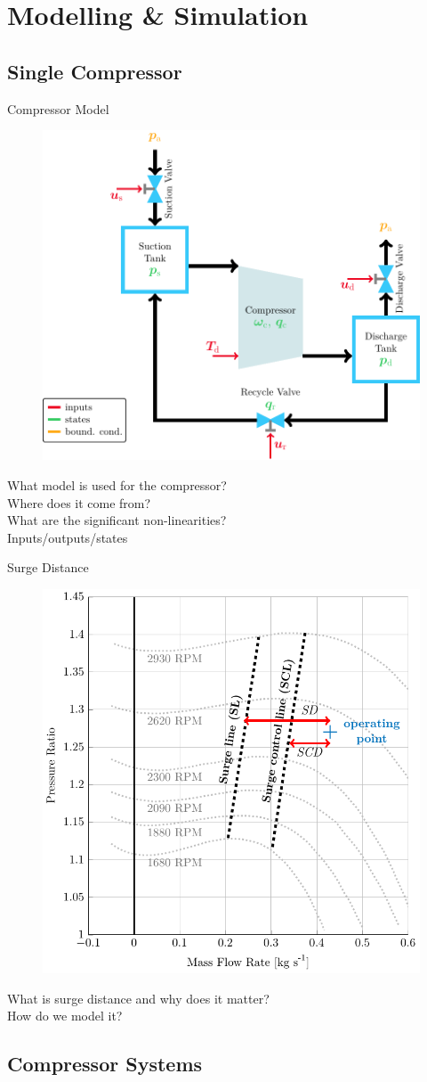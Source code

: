 \section{Modelling \& Simulation}

\subsection{Single Compressor}
\begin{frame}{Compressor Model}
  \begin{figure}[H]
    \centering
    \includegraphics[width=.5\linewidth]{figures/compressor.pdf}
  \end{figure}
  What model is used for the compressor?\\
  Where does it come from?\\
  What are the significant non-linearities?\\
  Inputs/outputs/states
\end{frame}

\begin{frame}{Surge Distance}
  \begin{figure}[H]
    \centering
    \includegraphics[width=.3\linewidth]{figures/surge.pdf}
  \end{figure}
  What is surge distance and why does it matter?\\
  How do we model it?\\
\end{frame}

\subsection{Compressor Systems}

